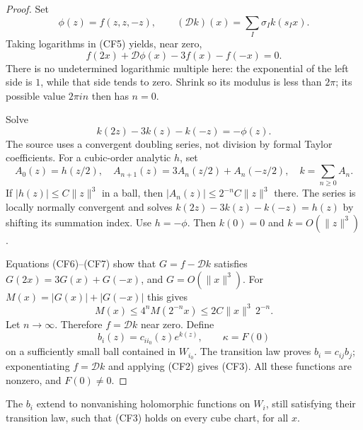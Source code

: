 \begin{proof}
Set
\[
 \phi(z)=f(z,z,-z),\qquad
 (\mathcal Dk)(x)=\sum_I\sigma_I k(s_Ix).
\]
Taking logarithms in (CF5) yields, near zero,
\[
       f(2x)+\mathcal D\phi(x)-3f(x)-f(-x)=0.               \tag{CF6}
\]
There is no undetermined logarithmic multiple here: the exponential
of the left side is \(1\), while that side tends to zero.  Shrink so
its modulus is less than \(2\pi\); its possible value
\(2\pi i n\) then has \(n=0\).

Solve
\[
                    k(2z)-3k(z)-k(-z)=-\phi(z).            \tag{CF7}
\]
The source uses a convergent doubling series, not division by formal
Taylor coefficients.  For a cubic-order analytic \(h\), set
\[
 A_0(z)=h(z/2),\quad
 A_{n+1}(z)=3A_n(z/2)+A_n(-z/2),\quad k=\sum_{n\ge0}A_n.
\]
If \(|h(z)|\le C\|z\|^3\) in a ball, then
\(|A_n(z)|\le2^{-n}C\|z\|^3\) there.
The series is locally normally convergent and solves
\(k(2z)-3k(z)-k(-z)=h(z)\) by shifting its summation index.
Use \(h=-\phi\).  Then \(k(0)=0\) and \(k=O(\|z\|^3)\).

Equations (CF6)--(CF7) show that
\(G=f-\mathcal Dk\) satisfies
\(G(2x)=3G(x)+G(-x)\), and \(G=O(\|x\|^3)\).
For \(M(x)=|G(x)|+|G(-x)|\) this gives
\[
 M(x)\le4^n M(2^{-n}x)
               \le2C\|x\|^3\,2^{-n}.
\]
Let \(n\to\infty\).  Therefore \(f=\mathcal Dk\) near zero.
Define
\[
          b_i(z)=c_{ii_0}(z)e^{k(z)},\qquad \kappa=F(0)
\]
on a sufficiently small ball contained in \(W_{i_0}\).
The transition law proves \(b_i=c_{ij}b_j\); exponentiating
\(f=\mathcal Dk\) and applying (CF2) gives (CF3).
All these functions are nonzero, and \(F(0)\ne0\).
\end{proof}

\begin{srlemma}
\label{lem:ftb-cube-global-frame}
The \(b_i\) extend to nonvanishing holomorphic functions on \(W_i\),
still satisfying their transition law, such that (CF3) holds on every
cube chart, for all \(x\).
\end{srlemma}


